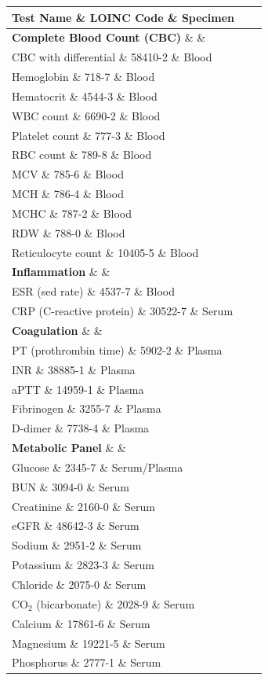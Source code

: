 \begin{longtable}{@{}lll@{}}
\toprule
\textbf{Test Name} \& \textbf{LOINC Code} \& \textbf{Specimen} \\
\midrule
\endhead
\textbf{Complete Blood Count (CBC)} \& \& \\
CBC with differential \& 58410-2 \& Blood \\
Hemoglobin \& 718-7 \& Blood \\
Hematocrit \& 4544-3 \& Blood \\
WBC count \& 6690-2 \& Blood \\
Platelet count \& 777-3 \& Blood \\
RBC count \& 789-8 \& Blood \\
MCV \& 785-6 \& Blood \\
MCH \& 786-4 \& Blood \\
MCHC \& 787-2 \& Blood \\
RDW \& 788-0 \& Blood \\
Reticulocyte count \& 10405-5 \& Blood \\
\textbf{Inflammation} \& \& \\
ESR (sed rate) \& 4537-7 \& Blood \\
CRP (C-reactive protein) \& 30522-7 \& Serum \\
\textbf{Coagulation} \& \& \\
PT (prothrombin time) \& 5902-2 \& Plasma \\
INR \& 38885-1 \& Plasma \\
aPTT \& 14959-1 \& Plasma \\
Fibrinogen \& 3255-7 \& Plasma \\
D-dimer \& 7738-4 \& Plasma \\
\textbf{Metabolic Panel} \& \& \\
Glucose \& 2345-7 \& Serum/Plasma \\
BUN \& 3094-0 \& Serum \\
Creatinine \& 2160-0 \& Serum \\
eGFR \& 48642-3 \& Serum \\
Sodium \& 2951-2 \& Serum \\
Potassium \& 2823-3 \& Serum \\
Chloride \& 2075-0 \& Serum \\
CO$_2$ (bicarbonate) \& 2028-9 \& Serum \\
Calcium \& 17861-6 \& Serum \\
Magnesium \& 19221-5 \& Serum \\
Phosphorus \& 2777-1 \& Serum \\

\end{longtable}
